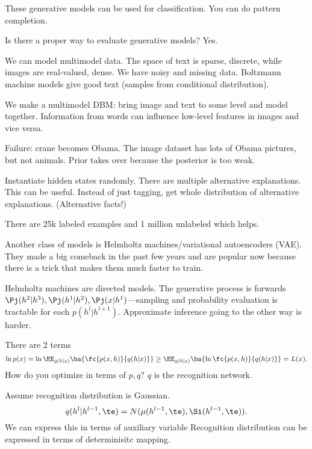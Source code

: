 These generative models can be used for classification.
You can do pattern completion.

Is there a proper way to evaluate generative models? Yes.

We can model multimodel data. The space of text is sparse, discrete, while images are real-valued, dense. 
We have noisy and missing data. Boltzmann machine models give good text (samples from conditional distribution).

We make a multimodel DBM: bring image and text to some level and model together. Information from words can influence low-level features in images and vice versa.

Failure: crane becomes Obama. The image dataset has lots of Obama pictures, but not animals. Prior takes over because the posterior is too weak.

Instantiate hidden states randomly. There are multiple alternative explanations. This can be useful. Instead of just tagging, get whole distribution of alternative explanations. (Alternative facts!)


There are 25k labeled examples and 1 million unlabeled which helps.

Another class of models is Helmholtz machines/variational autoencoders (VAE). They made a big comeback in the past few years and are popular now because there is a trick that makes them much faster to train.

Helmholtz machines are directed models. 
The generative process is forwards $\Pj(h^2|h^3),\Pj(h^1|h^2), \Pj(x|h^1)$---sampling and probability evaluation is tractable for each  $p(h^l|h^{l+1})$.
Approximate inference going to the other way is harder.


There are 2 terms
$$
\ln p(x) = \ln \EE_{q(h|x)}\ba{\fc{p(x,h)}{q(h|x)}}\ge \EE_{q(h|x)} \ba{\ln \fc{p(x,h)}{q(h|x)}} = L(x).
$$
How do you optimize in terms of $p,q$? $q$ is the recognition network. 

Assume recognition distribution is Gaussian.
$$
q(h^l|h^{l-1},\te) = N(\mu(h^{l-1},\te), \Si(h^{l-1},\te)).
$$
We can express this in terms of auxiliary variable
Recognition distribution can be expressed in terms of determinisitc mapping.

